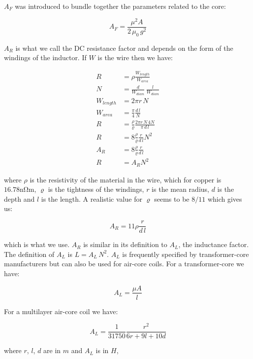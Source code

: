 \documentclass[]{../common/elementary-physics}
\begin{document}
$A_F$ was introduced to bundle together the parameters related to the core:

\begin{equation}
A_F = \frac{\mu^2 A}{2 \, \mu_0 \, g^2}
\end{equation}

$A_R$ is what we call the DC resistance factor and depends on the form of the windings of the inductor.
If $W$ is the wire then we have:

\begin{subequations}
\begin{align}
R &= \rho \frac{W_{length}}{W_{area}} \\
N &= \frac{d}{W_{diam}} \, \frac{l}{W_{diam}} \\
W_{length} &= 2 \pi r \, N \\
W_{area} &= \frac{\pi}{4} \frac{d \, l}{N} \\
R &= \frac{\rho}{\varrho} \frac{2 \pi r \, N \, 4 N}{\pi \, d \, l} \\
R &= 8 \frac{\rho}{\varrho} \frac{r}{d \, l} N^2 \\
A_R &= 8 \frac{\rho}{\varrho} \frac{r}{d \, l} \\
R &= A_R N^2
\end{align}
\end{subequations}

where $\rho$ is the resistivity of the material in the wire, which for copper is $16.78 \si{\nano\ohm\metre}$, $\varrho$ is the tightness of the windings, $r$ is the mean radius, $d$ is the depth and $l$ is the length.
A realistic value for $\varrho$ seems to be $8/11$ which gives us:

\begin{equation}
A_R = 11 \rho \frac{r}{d \, l}
\end{equation}

which is what we use.
$A_R$ is similar in its definition to $A_L$, the inductance factor.
The definition of $A_L$ is $L = A_L \, N^2$.
$A_L$ is frequently specified by transformer-core manufacturers but can also be used for air-core coils. 
For a transformer-core we have:

\begin{equation}
A_L = \frac{\mu A}{l}
\end{equation}

For a multilayer air-core coil we have\cite{wpind}:

\begin{equation}
A_L = \frac{1}{31750} \frac{r^2}{6r+9l+10d}
\end{equation}

where $r$, $l$, $d$ are in $m$ and $A_L$ is in $H$,



\printbibliography
\end{document}
